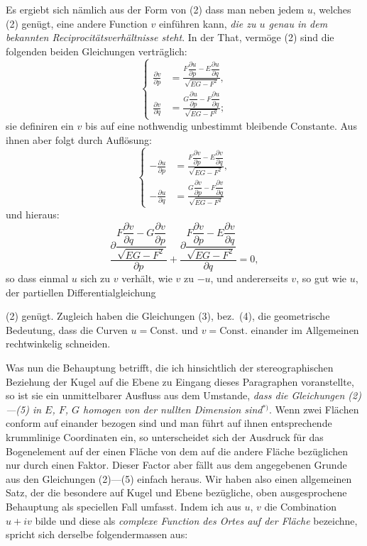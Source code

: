 \documentclass{article}
\begin{document}
Es ergiebt sich nämlich aus der Form von (2)\uncertain{;} dass man neben jedem $u$, welches (2) genügt, eine andere Function $v$ einführen kann, \emph{die zu $u$ genau in dem bekannten Reciprocitätsverhältnisse steht}. In der That, vermöge (2) sind die folgenden beiden Gleichungen verträglich:
\[ \left\{ \begin{aligned} \frac{\partial v}{\partial p} &= \frac{F\dfrac{\partial u}{\partial p} - E\dfrac{\partial u}{\partial q}}{\sqrt{EG - F^{2}}}, \\ \frac{\partial v}{\partial q} &= \frac{G\dfrac{\partial u}{\partial p} - F\dfrac{\partial u}{\partial q}}{\sqrt{EG - F^{2}}}; \end{aligned} \right. \tag{3} \]
sie definiren ein $v$ bis auf eine nothwendig unbestimmt bleibende Constante. Aus ihnen aber folgt durch Auflösung:
\[ \left\{ \begin{aligned} -\frac{\partial u}{\partial p} &= \frac{F\dfrac{\partial v}{\partial p} - E\dfrac{\partial v}{\partial q}}{\sqrt{EG - F^{2}}}, \\ -\frac{\partial u}{\partial q} &= \frac{G\dfrac{\partial v}{\partial p} - F\dfrac{\partial v}{\partial q}}{\sqrt{EG - F^{2}}} \end{aligned} \right. \tag{4} \]
und hieraus:
\[ \frac{\partial \dfrac{F\dfrac{\partial v}{\partial q} - G\dfrac{\partial v}{\partial p}}{\sqrt{EG - F^{2}}}}{\partial p} + \frac{\partial \dfrac{F\dfrac{\partial v}{\partial p} - E\dfrac{\partial v}{\partial q}}{\sqrt{EG - F^{2}}}}{\partial q} = 0, \tag{5} \]
so dass einmal $u$ sich zu $v$ verhält, wie $v$ zu $-u$, und andererseits $v$, so gut wie $u$, der partiellen Differentialgleichung

(2) genügt. Zugleich haben die Gleichungen (3), bez.~(4), die geometrische Bedeutung, dass die Curven $u = \text{Const.}$ und $v = \text{Const.}$ einander im Allgemeinen rechtwinkelig schneiden.

Was nun die Behauptung betrifft, die ich hinsichtlich der stereographischen Beziehung der Kugel auf die Ebene zu Eingang dieses Paragraphen voranstellte, so ist sie ein unmittelbarer Ausfluss aus dem Umstande, \emph{dass die Gleichungen (2)---(5) in $E$, $F$, $G$ homogen von der nullten Dimension sind}${}^{*)}$. Wenn zwei Flächen conform auf einander bezogen sind und man führt auf ihnen entsprechende krummlinige Coordinaten ein, so unterscheidet sich der Ausdruck für das Bogenelement auf der einen Fläche von dem auf die andere Fläche bezüglichen nur durch einen Faktor. Dieser Factor aber fällt aus dem angegebenen Grunde aus den Gleichungen (2)---(5) einfach heraus. Wir haben also einen allgemeinen Satz, der die besondere auf Kugel und Ebene bezügliche, oben ausgesprochene Behauptung als speciellen Fall umfasst. Indem ich aus $u$, $v$ die Combination $u + iv$ bilde und diese als \emph{complexe Function des Ortes auf der Fläche} bezeichne, spricht sich derselbe folgendermassen aus:
\end{document}
